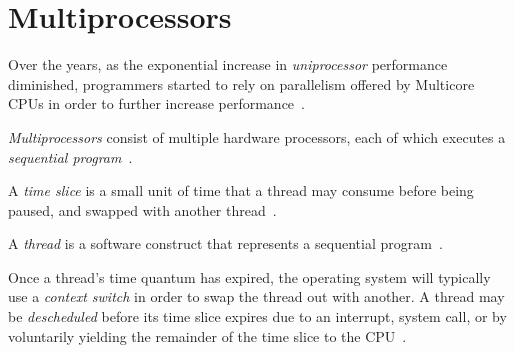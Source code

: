 



\section{Multiprocessors}
Over the years, as the exponential increase in \emph{uniprocessor} performance
diminished, programmers started to rely on parallelism offered by Multicore
CPUs in order to further increase performance~\cite{cantrill2008real}.

\emph{Multiprocessors} consist of multiple hardware processors, each of which
executes a \emph{sequential program}~\cite[Appendix~B.2]{herlihy2020art}.

A \emph{time slice} is a small unit of time that a thread may consume
before being paused, and swapped with another thread~\cite{osconcepts2021}.

A \emph{thread} is a software construct that represents a sequential program~\cite[Appendix~B.2]{herlihy2020art}.

Once a thread's time quantum has expired, the operating system will typically
use a \emph{context switch} in order to swap the thread out with another. A thread
may be \emph{descheduled} before its time slice expires due to an interrupt,
system call, or by voluntarily yielding the remainder of the time slice to the CPU~\cite[Section~3.2.3]{osconcepts2021}.

